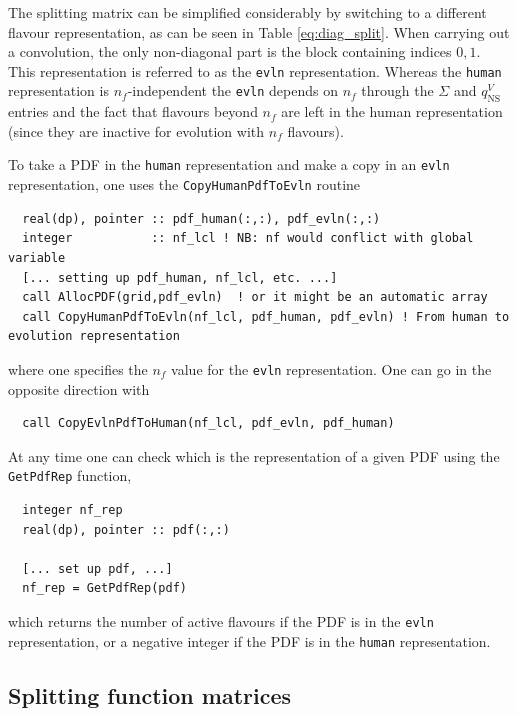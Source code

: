 \documentclass[12pt]{article}
\newcommand{\comment}[1]{\textbf{[#1]}}
\newcommand{\ttt}[1]{\texttt{#1}}
\begin{document}
The splitting matrix can be simplified considerably by switching to a different
flavour representation, as can be seen in Table \ref{eq:diag_split}. 
 When carrying out a convolution, the only non-diagonal part is the
block containing indices $0,1$. This representation is referred to as
the \ttt{evln} representation. Whereas the \ttt{human} representation
is $n_f$-independent the \ttt{evln} depends on $n_f$ through the
$\Sigma$ and $q_{\mathrm{NS}}^{V}$ entries and the fact that flavours
beyond $n_f$ are left in the human representation (since they are
inactive for evolution with $n_f$ flavours).

To take a PDF in the \ttt{human} representation and make a copy in an
\ttt{evln} representation, one uses the \ttt{CopyHumanPdfToEvln} routine
\begin{lstlisting}
  real(dp), pointer :: pdf_human(:,:), pdf_evln(:,:)
  integer           :: nf_lcl ! NB: nf would conflict with global variable
  [... setting up pdf_human, nf_lcl, etc. ...] 
  call AllocPDF(grid,pdf_evln)  ! or it might be an automatic array
  call CopyHumanPdfToEvln(nf_lcl, pdf_human, pdf_evln) ! From human to evolution representation
\end{lstlisting}
where one specifies the $n_f$ value for the \ttt{evln} representation.
One can go in the opposite direction with
\begin{lstlisting}
  call CopyEvlnPdfToHuman(nf_lcl, pdf_evln, pdf_human)
\end{lstlisting}
At any time one can check which is the representation of a given
PDF using the \ttt{GetPdfRep} function,
\begin{lstlisting}
  integer nf_rep
  real(dp), pointer :: pdf(:,:)

  [... set up pdf, ...]
  nf_rep = GetPdfRep(pdf)
\end{lstlisting}
which returns the number of active flavours if the PDF is in the
\ttt{evln} representation, or a negative integer if 
the PDF is in the
\ttt{human} representation.


\subsection{Splitting function matrices}
\label{sec:splitt-funct-matr}
\end{document}
